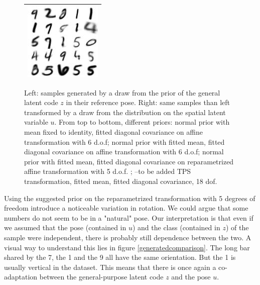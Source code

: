 \documentclass[letterpaper, twoside]{article}
\begin{document}
\begin{figure}[H]
\begin{minipage}{.5\textwidth}
\begin{tabular}{|@{}c@{}|}
  \includegraphics[scale=1]{manifold_sig_62.jpg}\\ \hline
  \end{tabular}
  \end{minipage}%
  \caption{Left: samples generated by a draw from the prior of the general latent code $z$ in their reference pose. Right: same samples than left transformed by a draw from the distribution on the spatial latent variable $u$. From top to bottom, different priors: normal prior with mean fixed to identity, fitted diagonal covariance on affine transformation with 6 d.o.f; normal prior with fitted mean, fitted diagonal covariance on affine transformation with 6 d.o.f; normal prior with fitted mean, fitted diagonal covariance on reparametrized affine transformation with 5 d.o.f. ; --to be added TPS transformation, fitted mean, fitted diagonal covariance, 18 dof.}
  \label{generatedwithpose} 
  \end{figure}

    Using the suggested prior on the reparametrized transformation with 5 degrees of freedom introduce a noticeable variation in rotation. We could argue that some numbers do not seem to be in a "natural" pose. Our interpretation is that even if we assumed that the pose (contained in $u$) and the class (contained in $z$) of the sample were independent, there is probably still dependence between the two. A visual way to understand this lies in figure \ref{generatedcomparison}. The long bar shared by the 7, the 1 and the 9 all have the same orientation. But the 1 is usually vertical in the dataset. This means that there is once again a co-adaptation between the general-purpose latent code $z$ and the pose $u$.\\
\end{document}
